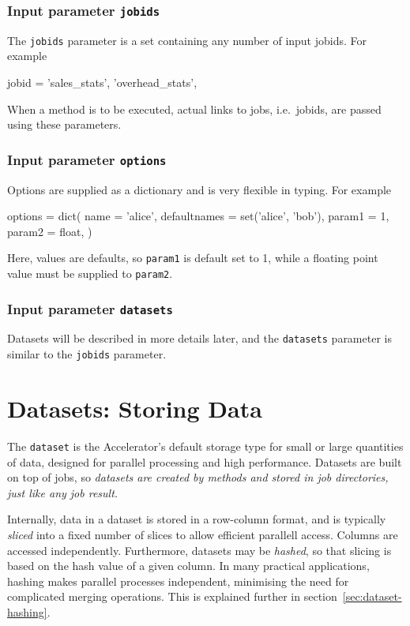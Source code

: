 \subsubsection*{Input parameter \texttt{jobids}}
The \texttt{jobids} parameter is a set containing any number of input
jobids.  For example
\begin{python}
jobid = {'sales_stats', 'overhead_stats',}
\end{python}
When a method is to be executed, actual links to jobs, i.e.\ jobids,
are passed using these parameters.


\subsubsection*{Input parameter \texttt{options}}
Options are supplied as a dictionary and is very flexible in typing.  For example
\begin{python}
options = dict(
    name = 'alice',
    defaultnames = set('alice', 'bob'),
    param1 = 1,
    param2 = float,
)
\end{python}
Here, values are defaults, so \texttt{param1} is default set to 1,
while a floating point value must be supplied to \texttt{param2}.

\subsubsection*{Input parameter \texttt{datasets}}
Datasets will be described in more details later, and the
\texttt{datasets} parameter is similar to the \texttt{jobids}
parameter.





\clearpage
\section{Datasets: Storing Data}

The \texttt{dataset} is the Accelerator's default storage type for
small or large quantities of data, designed for parallel processing
and high performance.  Datasets are built on top of jobs, so
\emph{datasets are created by methods and stored in job directories,
  just like any job result.}

Internally, data in a dataset is stored in a row-column format, and is
typically \emph{sliced} into a fixed number of slices to allow
efficient parallell access.  Columns are accessed independently.
Furthermore, datasets may be \textsl{hashed}, so that slicing is based
on the hash value of a given column.  In many practical applications,
hashing makes parallel processes independent, minimising the need for
complicated merging operations.  This is explained further in
section~\ref{sec:dataset-hashing}.



